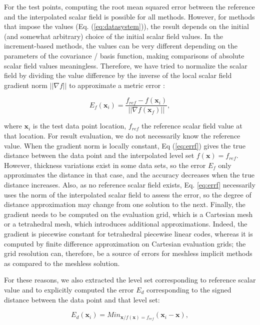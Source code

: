 \documentclass[final]{ring20}
\newcommand{\bx}{\mathbf{x}}
\begin{document}
{For the test points, computing the root mean squared error between the reference and the interpolated scalar field is possible for all methods. However, for methods that impose the values (Eq. (\ref{eq:datasystem})), the result depends on the initial (and somewhat arbitrary) choice of the initial scalar field values. In the increment-based methods, the values can be very different depending on the parameters of the covariance / basis function, making comparisons of absolute scalar field values meaningless. Therefore, we have tried to normalize the scalar field by dividing the value difference by the inverse of the local scalar field gradient norm $||\nabla f||$ to approximate a metric error \citep{Caumon2010MG}: 

\begin{equation}
\label{eq:errf}
E_f(\bx_i) = \frac{f_{ref} - f(\bx_i)}{||\nabla f(\bx_f)||},
\end{equation}

\noindent where $\bx_i$ is the test data point location, $f_{ref}$ the reference scalar field value at that location. For result evaluation, we do not necessarily know the reference value. When the gradient norm is locally constant, Eq (\ref{eq:errf}) gives the true distance between the data point and the interpolated level set $f(\bx) = f_{ref}$. However, thickness variations exist in some data sets, so the error $E_f$ only approximates the distance in that case, and the accuracy decreases when the true distance increases. Also, as no reference scalar field exists, Eq. \ref{eq:errf} necessarily uses the norm of the interpolated scalar field to assess the error, so the degree of distance approximation may change from one solution to the next. Finally, the gradient needs to be computed on the evaluation grid, which is a Cartesian mesh or a tetrahedral mesh, which introduces additional approximations. Indeed, the gradient is piecewise constant for tetrahedral piecewise linear codes, whereas it is computed by finite difference approximation on Cartesian evaluation grids; the grid resolution can, therefore, be a source of errors for meshless implicit methods as compared to the meshless solution. 

For these reasons, we also extracted the level set corresponding to reference scalar value and to explicitly computed the error $E_d$ corresponding to the signed distance between the data point and that level set: 

\begin{equation}
\label{eq:errd}
E_d(\bx_i) = Min_{\bx / f(\bx) = f_{ref}} (\bx_i - \bx),
\end{equation}

}
\end{document}
